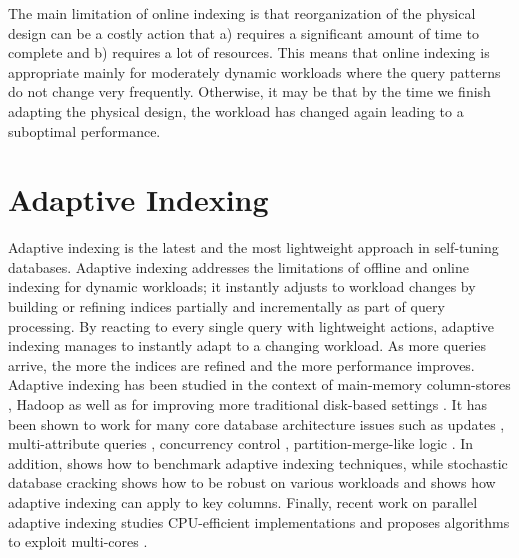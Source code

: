 The main limitation of online indexing is that reorganization  of the physical design can be a costly action
that a) requires a significant amount of time to complete and b) requires a lot of resources.
This means that online indexing is appropriate mainly for moderately dynamic workloads where the query patterns do not change
very frequently. Otherwise, it may be that by the time we finish adapting the physical design, the workload has changed again
leading to a suboptimal performance.



\section{Adaptive Indexing}
\label{sec:cracking}


Adaptive indexing is the latest and the most lightweight approach in self-tuning databases.
Adaptive indexing  addresses the limitations of offline and online indexing for dynamic workloads; 
it  instantly adjusts to workload changes by building or refining indices partially and incrementally as part of query processing.
By reacting to every single query with lightweight actions, adaptive indexing manages to instantly adapt
to a changing workload. As more queries arrive, the more the indices are refined 
and the more performance improves.
Adaptive indexing has been studied in the context of main-memory column-stores \cite{DBLP:conf/cidr/IdreosKM07, CrackRepeat}, Hadoop \cite{Hail}
as well as for improving more traditional disk-based settings \cite{DBLP:conf/edbt/GraefeK10}.
It has been shown to work for many core database architecture issues 
such as updates \cite{DBLP:conf/sigmod/IdreosKM07}, multi-attribute queries \cite{DBLP:conf/sigmod/IdreosKM09}, concurrency control \cite{multicore_adaptive, DBLP:journals/pvldb/GraefeHIKM12, DBLP:journals/vldb/GraefeHIKMS14}, partition-merge-like logic \cite{DBLP:conf/edbt/GraefeK10,DBLP:journals/pvldb/IdreosMKG11}. In addition, \cite{DBLP:conf/tpctc/GraefeIKM10} shows how to benchmark adaptive indexing techniques, while stochastic database cracking \cite{DBLP:journals/pvldb/HalimIKY12} shows how to be robust on various workloads and \cite{IndexingKeys} shows how adaptive indexing can apply to key columns.
Finally, recent work on parallel adaptive indexing studies CPU-efficient implementations and proposes algorithms to exploit multi-cores \cite{multicore_adaptive,efficient_cracking}.
 
